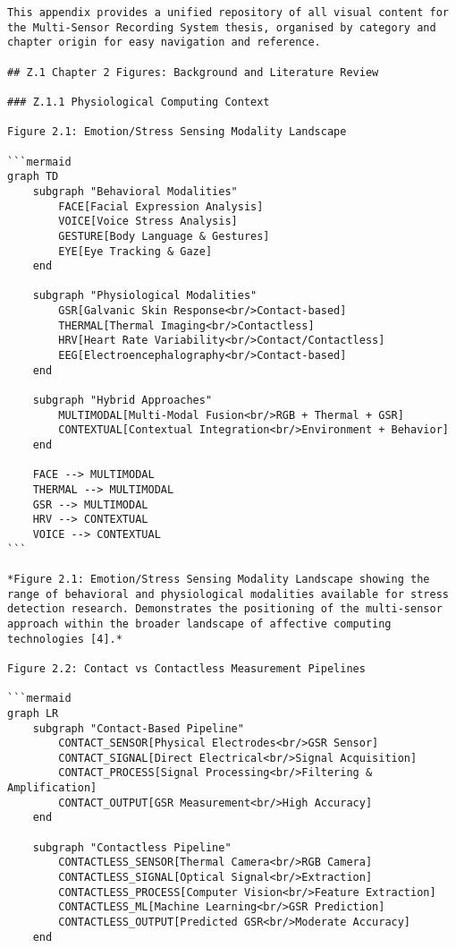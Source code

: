 \begin{verbatim}
This appendix provides a unified repository of all visual content for the Multi-Sensor Recording System thesis, organised by category and chapter origin for easy navigation and reference.

## Z.1 Chapter 2 Figures: Background and Literature Review

### Z.1.1 Physiological Computing Context

Figure 2.1: Emotion/Stress Sensing Modality Landscape

```mermaid
graph TD
    subgraph "Behavioral Modalities"
        FACE[Facial Expression Analysis]
        VOICE[Voice Stress Analysis]
        GESTURE[Body Language & Gestures]
        EYE[Eye Tracking & Gaze]
    end

    subgraph "Physiological Modalities"
        GSR[Galvanic Skin Response<br/>Contact-based]
        THERMAL[Thermal Imaging<br/>Contactless]
        HRV[Heart Rate Variability<br/>Contact/Contactless]
        EEG[Electroencephalography<br/>Contact-based]
    end

    subgraph "Hybrid Approaches"
        MULTIMODAL[Multi-Modal Fusion<br/>RGB + Thermal + GSR]
        CONTEXTUAL[Contextual Integration<br/>Environment + Behavior]
    end

    FACE --> MULTIMODAL
    THERMAL --> MULTIMODAL
    GSR --> MULTIMODAL
    HRV --> CONTEXTUAL
    VOICE --> CONTEXTUAL
```

*Figure 2.1: Emotion/Stress Sensing Modality Landscape showing the range of behavioral and physiological modalities available for stress detection research. Demonstrates the positioning of the multi-sensor approach within the broader landscape of affective computing technologies [4].*

Figure 2.2: Contact vs Contactless Measurement Pipelines

```mermaid
graph LR
    subgraph "Contact-Based Pipeline"
        CONTACT_SENSOR[Physical Electrodes<br/>GSR Sensor]
        CONTACT_SIGNAL[Direct Electrical<br/>Signal Acquisition]
        CONTACT_PROCESS[Signal Processing<br/>Filtering & Amplification]
        CONTACT_OUTPUT[GSR Measurement<br/>High Accuracy]
    end

    subgraph "Contactless Pipeline"
        CONTACTLESS_SENSOR[Thermal Camera<br/>RGB Camera]
        CONTACTLESS_SIGNAL[Optical Signal<br/>Extraction]
        CONTACTLESS_PROCESS[Computer Vision<br/>Feature Extraction]
        CONTACTLESS_ML[Machine Learning<br/>GSR Prediction]
        CONTACTLESS_OUTPUT[Predicted GSR<br/>Moderate Accuracy]
    end


\end{verbatim}
